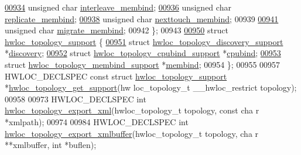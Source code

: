 \begin{DoxyCode}
\hypertarget{a00033_source_l00934}{}\hyperlink{a00025_a3c44c6012860bbeba8a0f4c19710858d}{00934}   \textcolor{keywordtype}{unsigned} \textcolor{keywordtype}{char} \hyperlink{a00025_a3c44c6012860bbeba8a0f4c19710858d}{interleave_membind};
\hypertarget{a00033_source_l00936}{}\hyperlink{a00025_afe608fb85eb2aa9706221ccb5fc4d415}{00936}   \textcolor{keywordtype}{unsigned} \textcolor{keywordtype}{char} \hyperlink{a00025_afe608fb85eb2aa9706221ccb5fc4d415}{replicate_membind};
\hypertarget{a00033_source_l00938}{}\hyperlink{a00025_ab0921af6e0cd6975812a80b8e5c7435c}{00938}   \textcolor{keywordtype}{unsigned} \textcolor{keywordtype}{char} \hyperlink{a00025_ab0921af6e0cd6975812a80b8e5c7435c}{nexttouch_membind};
00939 
\hypertarget{a00033_source_l00941}{}\hyperlink{a00025_aafa7683871a6a760246f9b35209caec5}{00941}   \textcolor{keywordtype}{unsigned} \textcolor{keywordtype}{char} \hyperlink{a00025_aafa7683871a6a760246f9b35209caec5}{migrate_membind};
00942 \};
00943 
\hypertarget{a00033_source_l00950}{}\hyperlink{a00026}{00950} \textcolor{keyword}{struct }\hyperlink{a00026}{hwloc_topology_support} \{
\hypertarget{a00033_source_l00951}{}\hyperlink{a00026_aea3fbd7653d987d81f848636c420504d}{00951}   \textcolor{keyword}{struct }\hyperlink{a00024}{hwloc_topology_discovery_support} *\hyperlink{a00026_aea3fbd7653d987d81f848636c420504d}{discovery};
\hypertarget{a00033_source_l00952}{}\hyperlink{a00026_adef2bb91f74c3e70a2a071393caf5f56}{00952}   \textcolor{keyword}{struct }\hyperlink{a00023}{hwloc_topology_cpubind_support} *\hyperlink{a00026_adef2bb91f74c3e70a2a071393caf5f56}{cpubind};
\hypertarget{a00033_source_l00953}{}\hyperlink{a00026_ac6eb62ae8bc0a68dce679a7107a36194}{00953}   \textcolor{keyword}{struct }\hyperlink{a00025}{hwloc_topology_membind_support} *\hyperlink{a00026_ac6eb62ae8bc0a68dce679a7107a36194}{membind};
00954 \};
00955 
00957 HWLOC\_DECLSPEC \textcolor{keyword}{const} \textcolor{keyword}{struct }\hyperlink{a00026}{hwloc_topology_support} *\hyperlink{a00044_gac2126e105f3ae708efca2e90d612625a}{hwloc_topology_get_support}(hw
      loc\_topology\_t \_\_hwloc\_restrict topology);
00958 
00973 HWLOC\_DECLSPEC \textcolor{keywordtype}{int} \hyperlink{a00045_ga45578d725c66865cfef31d0585dcff70}{hwloc_topology_export_xml}(hwloc\_topology\_t topology, \textcolor{keyword}{const} \textcolor{keywordtype}{cha
      r} *xmlpath);
00974 
00984 HWLOC\_DECLSPEC \textcolor{keywordtype}{int} \hyperlink{a00045_ga739330e9402425315e44e5012631fb91}{hwloc_topology_export_xmlbuffer}(hwloc\_topology\_t topology, \textcolor{keywordtype}{cha
      r} **xmlbuffer, \textcolor{keywordtype}{int} *buflen);

\end{DoxyCode}
